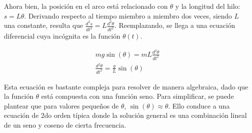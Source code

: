 \documentclass{article}
\begin{document}
Ahora bien, la posición en el arco está relacionado con $\theta$ y la longitud del hilo: $s = L \theta$. Derivando respecto al tiempo miembro a miembro dos veces, siendo $L$ una constante, resulta que $\frac{d^2s}{dt^2} = L \frac{d^2\theta}{dt^2}$. Reemplazando, se llega a una ecuación diferencial cuya incógnita es la función $\theta(t)$.

\begin{subequations}
\begin{align}
mg \sin(\theta) = m L \frac{d^2\theta}{dt^2} \\
\frac{d^2\theta}{dt^2} = \frac{g}{L} \sin(\theta)
\end{align}
\end{subequations}

Esta ecuación es bastante compleja para resolver de manera algebraica, dado que la función $\theta$ está compuesta con una función seno. Para simplificar, se puede plantear que para valores pequeños de $\theta$, $\sin(\theta) \approx \theta$. Ello conduce a una ecuación de 2do orden típica donde la solución general es una combinación lineal de un seno y coseno de cierta frecuencia.
\end{document}
